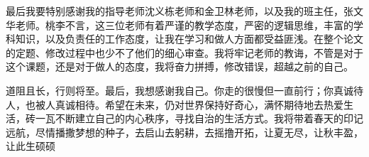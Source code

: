 \documentclass[AutoFakeBold]{LZUThesis}
\begin{document}
最后我要特别感谢我的指导老师沈义栋老师和金卫林老师，以及我的班主任，张文华老师。桃李不言，这三位老师有着严谨的教学态度，严密的逻辑思维，丰富的学科知识，以及负责任的工作态度，让我在学习和做人方面都受益匪浅。在整个论文的定题、修改过程中也少不了他们的细心审查。我将牢记老师的教诲，不管是对于这个课题，还是对于做人的态度，我将奋力拼搏，修改错误，超越之前的自己。

道阻且长，行则将至。最后，我想感谢我自己。你走的很慢但一直前行；你真诚待人，也被人真诚相待。希望在未来，仍对世界保持好奇心，满怀期待地去热爱生活，砖一瓦不断建立自己的内心秩序，寻找自治的生活方式。我将带着春天的印记远航，尽情播撒梦想的种子，去启山去躬耕，去摇撸开拓，让夏无尽，让秋丰盈，让此生硕硕

\Grade
\end{document}
